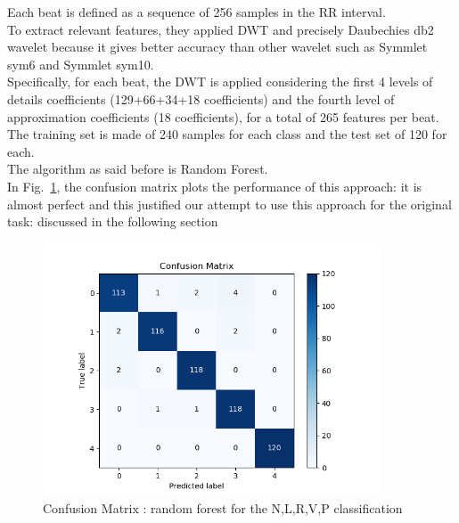 \documentclass[LaM,binding=0.6cm]{sapthesis}
\begin{document}
Each beat is defined as a sequence of 256 samples in the RR interval.\\To extract relevant features, they applied DWT and precisely Daubechies db2 wavelet because it gives better accuracy than other wavelet such as Symmlet sym6 and Symmlet sym10.\\Specifically, for each beat, the DWT is applied considering the first 4 levels of details coefficients (129+66+34+18 coefficients) and the fourth level of approximation coefficients (18 coefficients), for a total of 265 features per beat.\\The training set is made of 240 samples for each class and the test set of 120 for each.\\The algorithm as said before is Random Forest.\\In Fig.~\ref{fig:rf2}, the confusion matrix plots the performance of this approach: it is almost perfect and this justified our attempt to use this approach for the original task: discussed in the following section
\begin{figure}[H]  \centering
	\includegraphics[width=100mm,scale=0.7]{confusion-matrix-dwt-random-forest-paper.png}
	\caption{Confusion Matrix : random forest for the N,L,R,V,P classification}
	\label{fig:rf2}
\end{figure}
\end{document}
